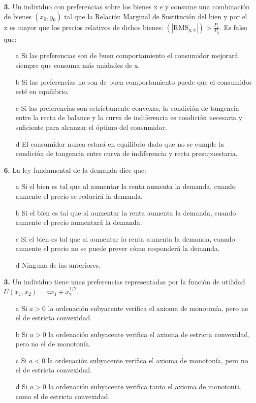 \documentclass{nuevotema}
\begin{document}
\textbf{3.} Un individuo con preferencias sobre los bienes x e y consume una combinación de bienes $(x_0, y_0)$ tal que la Relación Marginal de Sustitución del bien y por el x es mayor que los precios relativos de dichos bienes: $\left( | \text{RMS}_{y,x} | \right) > \frac{P_x}{P_y}$. Es falso que:
\begin{enumerate}
    \item[a] Si las preferencias son de buen comportamiento el consumidor mejorará siempre que consuma más unidades de x.
    \item[b] Si las preferencias no son de buen comportamiento puede que el consumidor esté en equilibrio.
    \item[c] Si las preferencias son estrictamente convexas, la condición de tangencia entre la recta de balance y la curva de indiferencia es condición necesaria y suficiente para alcanzar el óptimo del consumidor.
    \item[d] El consumidor nunca estará en equilibrio dado que no se cumple la condición de tangencia entre curva de indiferencia y recta presupuestaria.
\end{enumerate}

\textbf{6.} La ley fundamental de la demanda dice que:
\begin{enumerate}
    \item[a] Si el bien es tal que al aumentar la renta aumenta la demanda, cuando aumente el precio se reducirá la demanda.
    \item[b] Si el bien es tal que al aumentar la renta aumenta la demanda, cuando aumente el precio aumentará la demanda.
    \item[c] Si el bien es tal que al aumentar la renta aumenta la demanda, cuando aumente el precio no se puede prever cómo responderá la demanda.
    \item[d] Ninguna de las anteriores.
\end{enumerate}


\textbf{3.} Un individuo tiene unas preferencias representadas por la función de utilidad $U(x_1, x_2) = ax_1 + x_2^{1/2}$.
\begin{enumerate}
    \item[a] Si $a>0$ la ordenación subyacente verifica el axioma de monotonía, pero no el de estricta convexidad.
    \item[b] Si $a>0$ la ordenación subyacente verifica el axioma de estricta convexidad, pero no el de monotonía.
    \item[c] Si $a<0$ la ordenación subyacente verifica el axioma de monotonía, pero no el de estricta convexidad.
    \item[d] Si $a>0$ la ordenación subyacente verifica tanto el axioma de monotonía, como el de estricta convexidad.
\end{enumerate}
\end{document}
